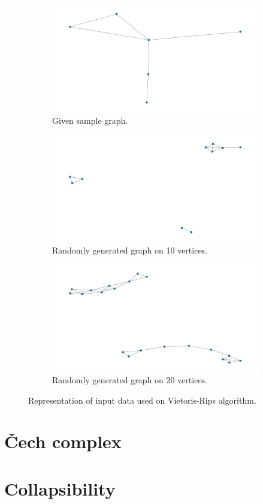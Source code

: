 \documentclass{article}
\begin{document}
\begin{figure}[H]
    \begin{subfigure}{0.33\linewidth}
        \centering
        \includegraphics[width=\textwidth]{vr1.png}
        \caption{Given sample graph.}\label{fig:vr1}
    \end{subfigure}
    \begin{subfigure}{0.33\linewidth}
        \centering
        \includegraphics[width=\textwidth]{vr2.png}
        \caption{Randomly generated graph on 10 vertices.}\label{fig:vr2}
    \end{subfigure}
    \begin{subfigure}{0.33\linewidth}
        \centering
        \includegraphics[width=\textwidth]{vr3.png}
        \caption{Randomly generated graph on 20 vertices.}\label{fig:vr3}
    \end{subfigure}
    \caption{Representation of input data used on Vietoris-Rips algorithm.}\label{fig:vrGraphs}
\end{figure}





\section{Čech complex}\label{sec:p4}

\section{Collapsibility}\label{sec:p5}
\end{document}
